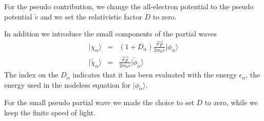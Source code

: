 \documentclass[11pt,a4paper]{report}
\begin{document}
For the pseudo contribution, we change the all-electron potential to
the pseudo potential $\tilde{v}$ and we set the relativistic factor
$D$ to zero. 

In addition we introduce the small components of the partial waves 
\begin{eqnarray}
|\chi_\alpha\rangle&=&(1+D_\alpha)\frac{\vec{\sigma}\vec{p}}{2m_0c}
|\phi_\alpha\rangle
\nonumber\\
|\tilde{\chi}_\alpha\rangle&=&\frac{\vec{\sigma}\vec{p}}{2m_0c}
|\tilde{\phi}_\alpha\rangle
\end{eqnarray}
The index on the $D_\alpha$ indicates that it has been evaluated with
the energy $\epsilon_\alpha$, the energy used in the nodeless equation
for $|\phi_\alpha\rangle$.

For the small pseudo partial wave we made the choice to set $D$ to
zero, while we keep the finite speed of light.
\end{document}
